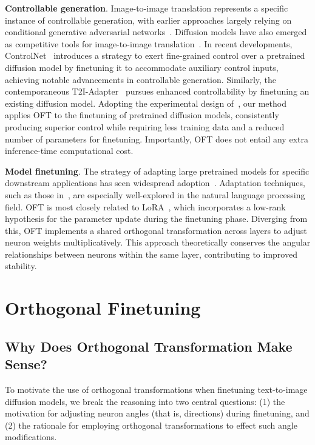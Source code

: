 \textbf{Controllable generation}. Image-to-image translation represents a specific instance of controllable generation, with earlier approaches largely relying on conditional generative adversarial networks~\cite{isola2017image,zhu2017toward,wang2018high,park2019semantic,choi2018stargan}. Diffusion models have also emerged as competitive tools for image-to-image translation~\cite{saharia2022palette,voynov2022sketch,wang2022pretraining}. In recent developments, ControlNet~\cite{zhang2023adding} introduces a strategy to exert fine-grained control over a pretrained diffusion model by finetuning it to accommodate auxiliary control inputs, achieving notable advancements in controllable generation. Similarly, the contemporaneous T2I-Adapter~\cite{mou2023t2i} pursues enhanced controllability by finetuning an existing diffusion model. Adopting the experimental design of~\cite{zhang2023adding,mou2023t2i}, our method applies OFT to the finetuning of pretrained diffusion models, consistently producing superior control while requiring less training data and a reduced number of parameters for finetuning. Importantly, OFT does not entail any extra inference-time computational cost.

\textbf{Model finetuning}. The strategy of adapting large pretrained models for specific downstream applications has seen widespread adoption~\cite{devlin2018bert,brown2020language,he2022masked}. Adaptation techniques, such as those in~\cite{hulora2022,houlsby2019parameter,pfeiffer2020adapterfusion}, are especially well-explored in the natural language processing field. OFT is most closely related to LoRA~\cite{hulora2022}, which incorporates a low-rank hypothesis for the parameter update during the finetuning phase. Diverging from this, OFT implements a shared orthogonal transformation across layers to adjust neuron weights multiplicatively. This approach theoretically conserves the angular relationships between neurons within the same layer, contributing to improved stability.

\section{Orthogonal Finetuning}

\subsection{Why Does Orthogonal Transformation Make Sense?}

To motivate the use of orthogonal transformations when finetuning text-to-image diffusion models, we break the reasoning into two central questions: (1) the motivation for adjusting neuron angles (that is, directions) during finetuning, and (2) the rationale for employing orthogonal transformations to effect such angle modifications.

